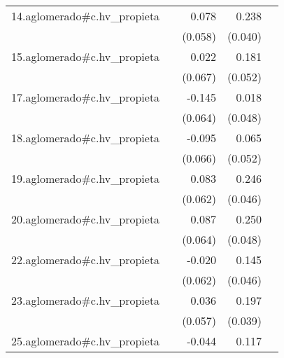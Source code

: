 {\begin{longtable}{l*{4}{D{.}{.}{-1}}}
\addlinespace
14.aglomerado#c.hv\_propieta&                     &       0.078         &       0.238\sym{***}&                     \\
            &                     &     (0.058)         &     (0.040)         &                     \\
\addlinespace
15.aglomerado#c.hv\_propieta&                     &       0.022         &       0.181\sym{***}&                     \\
            &                     &     (0.067)         &     (0.052)         &                     \\
\addlinespace
17.aglomerado#c.hv\_propieta&                     &      -0.145\sym{*}  &       0.018         &                     \\
            &                     &     (0.064)         &     (0.048)         &                     \\
\addlinespace
18.aglomerado#c.hv\_propieta&                     &      -0.095         &       0.065         &                     \\
            &                     &     (0.066)         &     (0.052)         &                     \\
\addlinespace
19.aglomerado#c.hv\_propieta&                     &       0.083         &       0.246\sym{***}&                     \\
            &                     &     (0.062)         &     (0.046)         &                     \\
\addlinespace
20.aglomerado#c.hv\_propieta&                     &       0.087         &       0.250\sym{***}&                     \\
            &                     &     (0.064)         &     (0.048)         &                     \\
\addlinespace
22.aglomerado#c.hv\_propieta&                     &      -0.020         &       0.145\sym{**} &                     \\
            &                     &     (0.062)         &     (0.046)         &                     \\
\addlinespace
23.aglomerado#c.hv\_propieta&                     &       0.036         &       0.197\sym{***}&                     \\
            &                     &     (0.057)         &     (0.039)         &                     \\
\addlinespace
25.aglomerado#c.hv\_propieta&                     &      -0.044         &       0.117\sym{*}  &                     \\

\end{longtable}}
